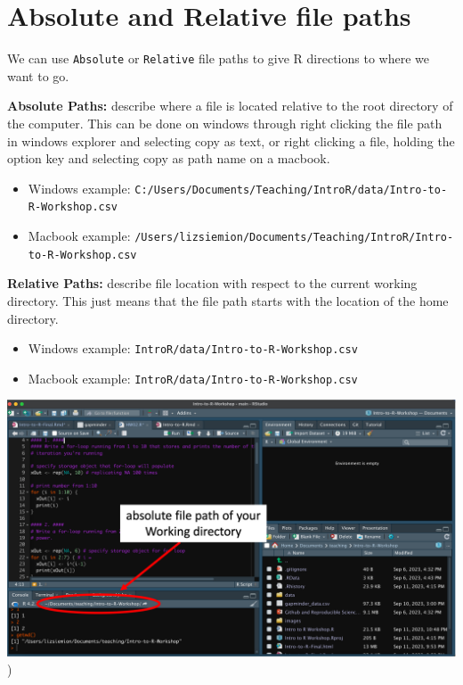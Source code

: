 \documentclass[
]{book}
\providecommand{\tightlist}{%
  \setlength{\itemsep}{0pt}\setlength{\parskip}{0pt}}
\begin{document}
\section{Absolute and Relative file paths}\label{absolute-and-relative-file-paths}

We can use \texttt{Absolute} or \texttt{Relative} file paths to give R directions to where we want to go.

\textbf{Absolute Paths:} describe where a file is located relative to the root directory of the computer. This can be done on windows through right clicking the file path in windows explorer and selecting copy as text, or right clicking a file, holding the option key and selecting copy as path name on a macbook.

\begin{itemize}
\tightlist
\item
  Windows example:
  \texttt{C:/Users/Documents/Teaching/IntroR/data/Intro-to-R-Workshop.csv}
\item
  Macbook example:
  \texttt{/Users/lizsiemion/Documents/Teaching/IntroR/Intro-to-R-Workshop.csv}
\end{itemize}

\textbf{Relative Paths:} describe file location with respect to the current working directory. This just means that the file path starts with the location of the home directory.

\begin{itemize}
\tightlist
\item
  Windows example:
  \texttt{IntroR/data/Intro-to-R-Workshop.csv}
\item
  Macbook example:
  \texttt{IntroR/data/Intro-to-R-Workshop.csv}
\end{itemize}

\includegraphics[width=0.9\linewidth,height=\textheight,keepaspectratio]{./docs/files/RProjectFilePath.png})
\end{document}
